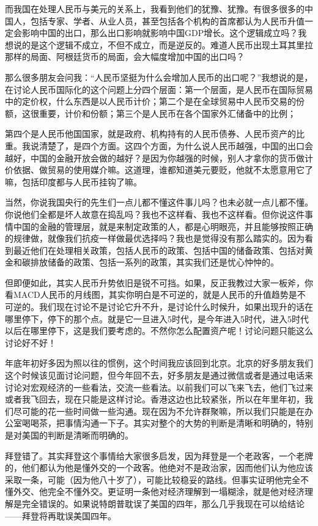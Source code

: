 \documentclass[UTF8, 12pt, a4paper]{ctexrep}
\begin{document}
而我国在处理人民币与美元的关系上，我看到他们的犹豫、犹豫。有很多很多的中国人，包括专家、学者、从业人员，甚至包括各个机构的首席都认为人民币升值一定会影响中国的出口，那么出口影响就影响中国GDP增长。这个逻辑成立吗？我想说的是这个逻辑不成立，不但不成立，而是逆反的。难道人民币出现土耳其里拉那样的局面、阿根廷货币的局面，会大幅度增加中国的出口吗？

那么很多朋友会问我：“人民币坚挺为什么会增加人民币的出口呢？”我想说的是，在讨论人民币国际化的这个问题上分四个层面：第一个层面，是人民币在国际贸易中的定价权，什么东西是以人民币计价；第二个是在全球贸易中人民币交易的份额，这很重要，计价和份额；第三个是人民币在各个国家外汇储备中的比例；

第四个是人民币他国国家，就是政府、机构持有的人民币债券、人民币资产的比重。我说清楚了，是四个方面。这四个方面，为什么说人民币越强，中国的出口会越好，中国的金融开放会做的越好？是因为你越强的时候，别人才拿你的货币做计价依据、做贸易的使用媒介嘛。这道理，谁都知道美元要贬，他就不太愿意用它了嘛，包括印度都与人民币挂钩了嘛。

当然，你说我国央行的先生们一点儿都不懂这件事儿吗？也未必就一点儿都不懂。你说他们全都是坏人故意在捣乱吗？我也不这样看、我也不这样看。但你说这件事情中国的金融的管理层，就是来制定政策的人，都是心明眼亮，并且能够按照正确的规律做，就像我们抗疫一样做最优选择吗？我也是觉得没有那么踏实的。因为看到最近他们在处理相关政策，包括人民币的政策、包括中国的储备政策、包括对黄金和碳排放储备的政策、包括一系列的政策，其实我们还是忧心忡忡的。

但即便如此，其实人民币升势依旧是锐不可挡。如果，反正我教过大家一板斧，你看MACD人民币的月线图，其实你明白是不可逆的，就是人民币的升值趋势是不可逆的。我们现在讨论不是讨论它升不升，是讨论什么时候升，如果出现升的话在哪里停下，停下的那个点。就是它一旦进入5时代，是今年进入5时代，进入5时代以后在哪里停下，这是我们要考虑的。不然你怎么配置资产呢！讨论问题只能这么讨论好不好！

年底年初好多因为照以往的惯例，这个时间我应该回到北京。北京的好多朋友我们这个时候该见面讨论问题，但今年回不去，好多朋友是通过微信或者是通过电话来讨论对宏观经济的一些看法，交流一些看法。以前我们可以飞来飞去，他们飞过来或者我飞回去，现在只能是这样讨论。香港这边也比较紧张，所以在年里年初，我们尽可能的花一些时间做一些沟通。现在因为不允许群聚嘛，所以我们只能是在办公室喝喝茶，把事情沟通一下子。其实对整个的大势的判断是清晰和明确的，特别是对美国的判断是清晰而明确的。

拜登错了。其实拜登这个事情给大家很多启发，因为拜登是一个老政客，一个老牌的，他们都认为他是懂外交的一个政客。他绝对不是政治家，因而他们认为他应该采取一条，可能（因为他八十岁了），可能比较稳妥的路线。但事实证明他完全不懂外交、他完全不懂外交。更证明一条他对经济理解到一塌糊涂，就是他对经济理解是完全错误的。如果说特朗普耽误了美国的四年，那么几乎我现在可以给结论——拜登将再耽误美国四年。
\end{document}
